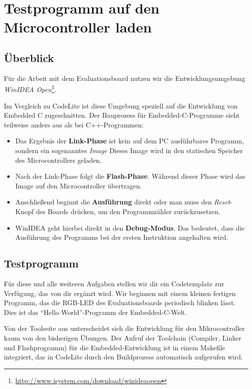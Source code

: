 \section{Testprogramm auf den Microcontroller laden \optional}

\subsection{Überblick}
Für die Arbeit mit dem Evaluationsboard nutzen wir die Entwicklungsumgebung \emph{WinIDEA Open}\footnote{\url{http://www.isystem.com/download/winideaopen}}.

Im Vergleich zu CodeLite ist diese Umgebung speziell auf die Entwicklung von Embedded C zugeschnitten.
Der Bauprozess für Embedded-C-Programme sieht teilweise anders aus als bei C++-Programmen:
\begin{itemize}
\item 
Das Ergebnis der \textbf{Link-Phase} ist kein auf dem PC ausführbares Programm, sondern ein sogenanntes \emph{Image}
Dieses Image wird in den statischen Speicher des Microcontrollers geladen.
\item
Nach der Link-Phase folgt die \textbf{Flash-Phase}.
Während dieser Phase wird das Image auf den Microcontroller übertragen.
\item 
Anschließend beginnt die \textbf{Ausführung} direkt oder man muss den \emph{Reset}-Knopf des Boards drücken, um den Programmzähler zurückzusetzen.
\item
WinIDEA geht hierbei direkt in den \textbf{Debug-Modus}.
Das bedeutet, dass die Ausführung des Programms bei der ersten Instruktion angehalten wird.
\end{itemize}

\subsection{Testprogramm}
Für diese und alle weiteren Aufgaben stellen wir dir ein Codetemplate zur Verfügung, das von dir ergänzt wird.
Wir beginnen mit einem kleinen fertigen Programm, das die RGB-LED des Evaluationsboards periodisch blinken lässt.
Dies ist das \enquote{Hello World}-Programm der Embedded-C-Welt.


Von der Toolseite aus unterscheidet sich die Entwicklung für den Mikrocontroller kaum von den bisherigen Übungen.
Der Aufruf der Toolchain (Compiler, Linker und Flashprogramm) für die Embedded-Entwicklung ist in einem Makefile integriert, das in CodeLite durch den Buildprozess automatisch aufgerufen wird.